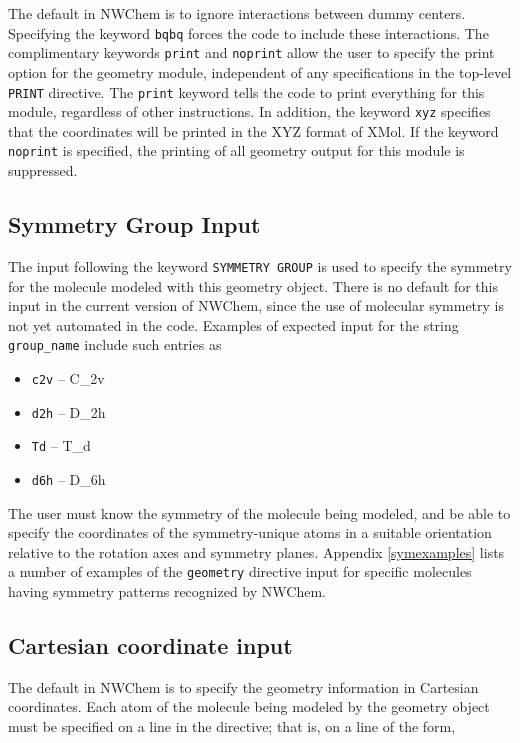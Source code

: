 The default in NWChem is to ignore interactions between dummy centers. 
Specifying the keyword \verb+bqbq+ forces the code to include these 
interactions.  The complimentary keywords \verb+print+ and \verb+noprint+
allow the user to specify the print option for the geometry module, 
independent of any specifications in the top-level \verb+PRINT+ directive.
The \verb+print+ keyword tells the code to print everything for this
module, regardless of other instructions.  In addition, the keyword
\verb+xyz+ specifies that the coordinates will be printed in the XYZ
format of XMol.  If the keyword \verb+noprint+ is specified, the printing
of all geometry output for this module is suppressed.

\subsection{Symmetry Group Input}

The input following the keyword \verb+SYMMETRY GROUP+ is used to specify
the symmetry for the molecule modeled with this geometry object.
There is no default for this input in the current version of NWChem, since
the use of molecular symmetry is not yet automated in the code.
Examples of expected input for the string \verb+group_name+ include
such entries as

\begin{itemize}
\item \verb+c2v+ -- C\_{2v}
\item \verb+d2h+ -- D\_{2h}
\item \verb+Td+ -- T\_{d}
\item \verb+d6h+ -- D\_{6h}
\end{itemize}

The user must know the symmetry of the molecule being modeled, and be able
to specify the
coordinates of the symmetry-unique atoms in a suitable orientation
relative to the rotation axes and symmetry planes.  
Appendix \ref{symexamples} lists a number of examples of the \verb+geometry+
directive input for specific molecules having symmetry patterns recognized
by NWChem.

\subsection{Cartesian coordinate input}
\label{sec:cart}

The default in NWChem is to specify the geometry information in Cartesian 
coordinates.  Each atom of the molecule being modeled by the geometry
object must be specified on a line in the directive; that is, on a line of
the form,

